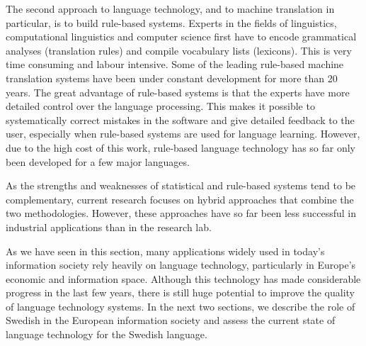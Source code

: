 \begin{multicols}{2}
The second approach to language technology, and to machine translation in particular, is to build rule-based systems. Experts in the fields of linguistics, computational linguistics and computer science first have to encode grammatical analyses (translation rules) and compile vocabulary lists (lexicons). This is very time consuming and labour intensive. Some of the leading rule-based machine translation systems have been under constant development for more than 20 years. The great advantage of rule-based systems is that the experts have more detailed control over the language processing. This makes it possible to systematically correct mistakes in the software and give detailed feedback to the user, especially when rule-based systems are used for language learning. However, due to the high cost of this work, rule-based language technology has so far only been developed for a few major languages. 

As the strengths and weaknesses of statistical and rule-based systems tend to be complementary, current research focuses on hybrid approaches that combine the two methodologies. However, these approaches have so far been less successful in industrial applications than in the research lab. 


As we have seen in this section, many applications widely used in today’s information society rely heavily on language technology, particularly in Europe’s economic and information space. Although this technology has made considerable progress in the last few years, there is still huge potential to improve the quality of language technology systems. In the next two sections, we describe the role of Swedish in the European information society and assess the current state of language technology for the Swedish language.
\end{multicols}

\clearpage


